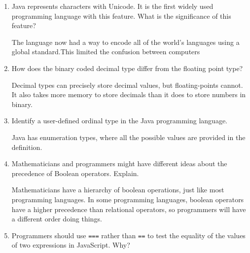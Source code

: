 \begin{enumerate}
\begin{answer}
    \end{answer}

  \item Java represents characters with Unicode. It is the first
    widely used programming language with this feature. What is the
    significance of this feature?

  \begin{answer}

    The language now had a way to encode all of the world's languages
    using a global standard.This limited the confusion between
    computers

    \end{answer}

  \item How does the binary coded decimal type differ from the
    floating point type?

  \begin{answer}

    Decimal types can precisely store decimal values, but
    floating-points cannot. It also takes more memory to store
    decimals than it does to store numbers in binary.

    \end{answer}

  \item Identify a user-defined ordinal type in the Java programming
    language.

  \begin{answer}

    Java has enumeration types, where all the possible values are
    provided in the definition.

    \end{answer}

  \item Mathematicians and programmers might have different ideas
    about the precedence of Boolean operators. Explain.

  \begin{answer}

    Mathematicians have a hierarchy of boolean operations, just like
    most programming languages. In some programming languages, boolean
    operators have a higher precedence than relational operators, so
    programmers will have a different order doing things.

    \end{answer}

  \item Programmers should use \verb+===+ rather than \verb+==+ to
    test the equality of the values of two expressions in JavaScript. Why?


\end{enumerate}
